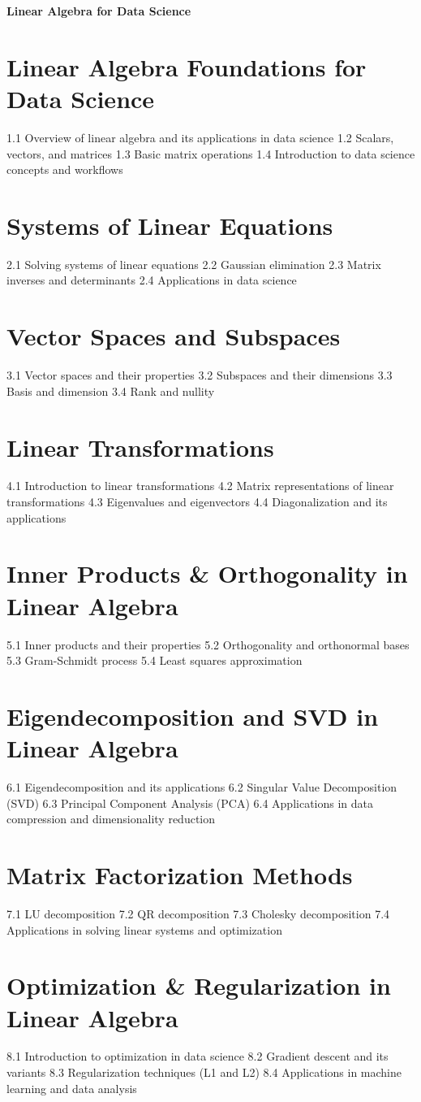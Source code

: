 {\LARGE \bf{Linear Algebra for Data Science}}
\section{Linear Algebra Foundations for Data Science}
1.1 Overview of linear algebra and its applications in data science
1.2 Scalars, vectors, and matrices
1.3 Basic matrix operations
1.4 Introduction to data science concepts and workflows
\section{Systems of Linear Equations}
2.1 Solving systems of linear equations
2.2 Gaussian elimination
2.3 Matrix inverses and determinants
2.4 Applications in data science
\section{Vector Spaces and Subspaces}
3.1 Vector spaces and their properties
3.2 Subspaces and their dimensions
3.3 Basis and dimension
3.4 Rank and nullity
\section{Linear Transformations}
4.1 Introduction to linear transformations
4.2 Matrix representations of linear transformations
4.3 Eigenvalues and eigenvectors
4.4 Diagonalization and its applications
\section{Inner Products \& Orthogonality in Linear Algebra}
5.1 Inner products and their properties
5.2 Orthogonality and orthonormal bases
5.3 Gram-Schmidt process
5.4 Least squares approximation
\section{Eigendecomposition and SVD in Linear Algebra}
6.1 Eigendecomposition and its applications
6.2 Singular Value Decomposition (SVD)
6.3 Principal Component Analysis (PCA)
6.4 Applications in data compression and dimensionality reduction
\section{Matrix Factorization Methods}
7.1 LU decomposition
7.2 QR decomposition
7.3 Cholesky decomposition
7.4 Applications in solving linear systems and optimization
\section{Optimization \& Regularization in Linear Algebra}
8.1 Introduction to optimization in data science
8.2 Gradient descent and its variants
8.3 Regularization techniques (L1 and L2)
8.4 Applications in machine learning and data analysis
